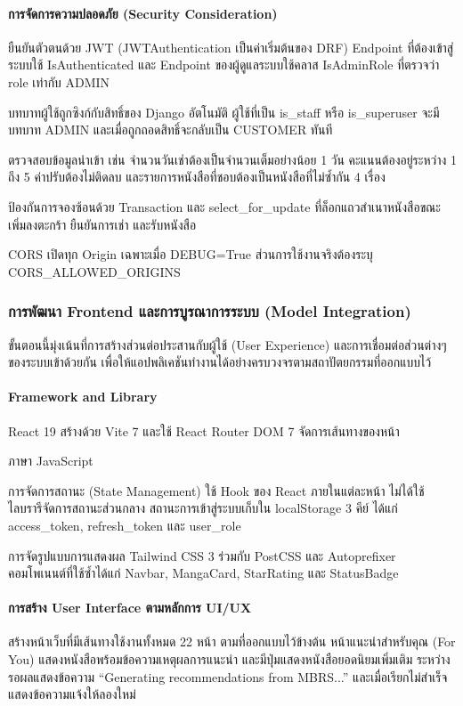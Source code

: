 \paragraph{การจัดการความปลอดภัย (Security Consideration)}

ยืนยันตัวตนด้วย JWT (JWTAuthentication เป็นค่าเริ่มต้นของ DRF) Endpoint ที่ต้องเข้าสู่ระบบใช้ IsAuthenticated และ Endpoint ของผู้ดูแลระบบใช้คลาส IsAdminRole ที่ตรวจว่า role เท่ากับ ADMIN

บทบาทผู้ใช้ถูกซิงก์กับสิทธิ์ของ Django อัตโนมัติ ผู้ใช้ที่เป็น is\_staff หรือ is\_superuser จะมีบทบาท ADMIN และเมื่อถูกถอดสิทธิ์จะกลับเป็น CUSTOMER ทันที 

ตรวจสอบข้อมูลนำเข้า เช่น จำนวนวันเช่าต้องเป็นจำนวนเต็มอย่างน้อย 1 วัน คะแนนต้องอยู่ระหว่าง 1 ถึง 5 ค่าปรับต้องไม่ติดลบ และรายการหนังสือที่ชอบต้องเป็นหนังสือที่ไม่ซ้ำกัน 4 เรื่อง

ป้องกันการจองซ้อนด้วย Transaction และ select\_for\_update ที่ล็อกแถวสำเนาหนังสือขณะเพิ่มลงตะกร้า ยืนยันการเช่า และรับหนังสือ

CORS เปิดทุก Origin เฉพาะเมื่อ DEBUG=True ส่วนการใช้งานจริงต้องระบุ CORS\_ALLOWED\_ORIGINS

\subsubsection{การพัฒนา Frontend และการบูรณาการระบบ (Model Integration)}
ขั้นตอนนี้มุ่งเน้นที่การสร้างส่วนต่อประสานกับผู้ใช้ (User Experience) และการเชื่อมต่อส่วนต่างๆ ของระบบเข้าด้วยกัน เพื่อให้แอปพลิเคชันทำงานได้อย่างครบวงจรตามสถาปัตยกรรมที่ออกแบบไว้

\paragraph{Framework and Library}
React 19 สร้างด้วย Vite 7 และใช้ React Router DOM 7 จัดการเส้นทางของหน้า 

ภาษา JavaScript  

การจัดการสถานะ (State Management) ใช้ Hook ของ React ภายในแต่ละหน้า ไม่ได้ใช้ไลบรารีจัดการสถานะส่วนกลาง สถานะการเข้าสู่ระบบเก็บใน localStorage 3 คีย์ ได้แก่ access\_token, refresh\_token และ user\_role

การจัดรูปแบบการแสดงผล Tailwind CSS 3 ร่วมกับ PostCSS และ Autoprefixer คอมโพเนนต์ที่ใช้ซ้ำได้แก่ Navbar, MangaCard, StarRating และ StatusBadge

\paragraph{การสร้าง User Interface ตามหลักการ UI/UX}
สร้างหน้าเว็บที่มีเส้นทางใช้งานทั้งหมด 22 หน้า ตามที่ออกแบบไว้ข้างต้น หน้าแนะนำสำหรับคุณ (For You) แสดงหนังสือพร้อมข้อความเหตุผลการแนะนำ และมีปุ่มแสดงหนังสือยอดนิยมเพิ่มเติม ระหว่างรอผลแสดงข้อความ ``Generating recommendations from MBRS...'' และเมื่อเรียกไม่สำเร็จแสดงข้อความแจ้งให้ลองใหม่

